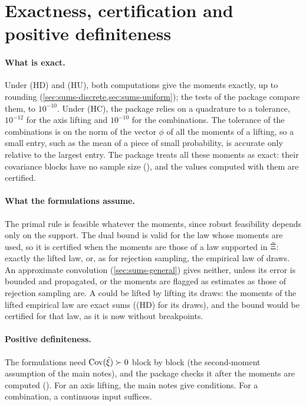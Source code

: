 \documentclass[11pt,a4paper]{article}
\numberwithin{equation}{section}
\newcommand{\Hyp}[1]{\textup{(H#1)}}    %
\begin{document}
\section{Exactness, certification and positive definiteness}
\label{sec:exactness}

\paragraph{What is exact.}
Under \Hyp{D} and \Hyp{U}, both computations give the moments exactly, up to rounding (\cref{sec:sums-discrete,sec:sums-uniform});
the tests of the package compare them, to $10^{-10}$.
Under \Hyp{C}, the package relies on a quadrature to a tolerance, $10^{-12}$ for the axis lifting and $10^{-10}$ for the combinations.
The tolerance of the combinations is on the norm of the vector $\phi$ of all the moments of a lifting,
so a small entry, such as the mean of a piece of small probability, is accurate only relative to the largest entry.
The package treats all these moments as exact: their covariance blocks have no sample size (), and the values computed with them are certified.

\paragraph{What the formulations assume.}
The primal rule is feasible whatever the moments, since robust feasibility depends only on the support.
The dual bound is valid for the law whose moments are used,
so it is certified when the moments are those of a law supported in $\tilde\Xi$:
exactly the lifted law, or, as for rejection sampling, the empirical law of draws.
An approximate convolution (\cref{sec:sums-general}) gives neither, unless its error is bounded and propagated, or the moments are flagged as estimates as those of rejection sampling are.
A  could be lifted by lifting its draws: the moments of the lifted empirical law are exact sums (\Hyp{D} for its draws), and the bound would be certified for that law, as it is now without breakpoints.

\paragraph{Positive definiteness.}
The formulations need $\operatorname{Cov}(\tilde\xi) \succ 0$ block by block (the second-moment assumption of the main notes), and the package checks it after the moments are computed ().
For an axis lifting, the main notes give conditions.
For a combination, a continuous input suffices.
\end{document}

